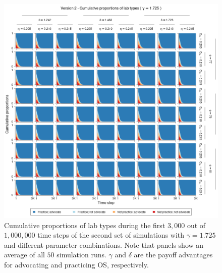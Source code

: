 \documentclass[meta, authordate]{jote-new-article}
\begin{document}
\begin{figure}
  \begin{fullwidth}
    \centering
    \includegraphics[width=\textwidth]{v2_pro_plot_sens_payypro1.725.png}
    \caption{Cumulative proportions of lab types during the first $3,000$ out of $1,000,000$ time steps of the second set of simulations with $\gamma=1.725$ and different parameter combinations. Note that panels show an average of all $50$ simulation runs. $\gamma$ and $\delta$ are the payoff advantages for advocating and practicing OS, respectively.}
    \label{fig:v2_pro_plot_sens_payypro1.725}
  \end{fullwidth}
\end{figure}
%
%
\end{document}
